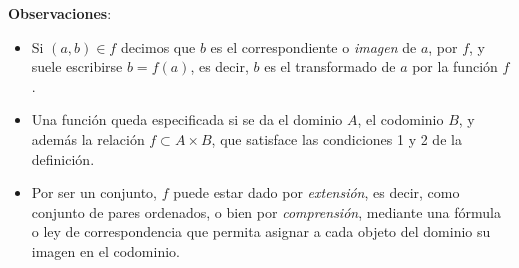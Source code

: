 \textbf{Observaciones}:
\begin{itemize}
	\item Si $(a, b) \in f$ decimos que $b$ es el correspondiente o \textit{imagen} de $a$,
	por $f$, y suele escribirse $b = f(a)$, es decir, $b$ es el transformado de $a$
	por la función $f$.
	\item Una función queda especificada si se da el dominio $A$, el codominio $B$,
	y además la relación $f \subset A \times B$, que satisface las condiciones 1 y
	2 de la definición.
	\item Por ser un conjunto, $f$ puede estar dado por \textit{extensión}, es decir,
	como conjunto de pares ordenados, o bien por \textit{comprensión}, mediante una
	fórmula o ley de correspondencia que permita asignar a cada objeto del dominio su
	imagen en el codominio.
\end{itemize}%

